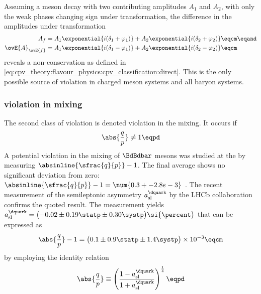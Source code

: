 Assuming a meson decay with two contributing amplitudes $A_1$ and $A_2$, with
only the weak phases changing sign under \CP transformation, the difference in
the amplitudes under \CP transformation
%
\begin{equation}
  \begin{split}
                A_{f} &= A_1 \exponential{i(\delta_1 + \varphi_1)} + A_2 \exponential{i(\delta_2 + \varphi_2)} \eqcm\eqand \\
    \ovE{A}_{\ovE{f}} &= A_1 \exponential{i(\delta_1 - \varphi_1)} + A_2 \exponential{i(\delta_2 - \varphi_2)} \eqcm
  \end{split}
\end{equation}
%
reveals a \CP non-conservation as defined in
\cref{eq:cpv_theory:flavour_physics:cpv_classification:direct}. This is the only
possible source of \CP violation in charged meson systems and all baryon
systems.

\subsubsection[\CP violation in mixing]{\CPbfsf violation in mixing}
\label{sec:cpv_theory:flavour_physics:cpv_classification:mixing}

The second class of \CP violation is denoted \CP violation in the mixing. It
occurs if
%
\begin{equation}
  \abs{\frac{q}{p}} \neq 1 \eqpd
\end{equation}
%
A potential \CP violation in the mixing of $\BdBdbar$ mesons was studied at the
\BFactories by measuring $\absinline{\sfrac{q}{p}} - 1$. The final \BFactory
average shows no significant deviation from zero: $\absinline{\sfrac{q}{p}} - 1
= \num{0.3 +- 2.8 e-3}$ \cite{Bevan:2014iga}. The recent measurement of the
semileptonic \CP asymmetry $a_{\text{sl}}^{\dquark}$ by the \acs*{LHCb}
collaboration confirms the quoted result. The measurement yields
$a_{\text{sl}}^{\dquark} = \bigl(-0.02 \pm 0.19 \statp \pm 0.30 \systp
\bigr)\si{\percent}$ \cite{Aaij:2014nxa} that can be expressed as
%
\begin{equation}
  \abs{\frac{q}{p}} - 1 = \bigl(0.1 \pm 0.9 \statp \pm 1.4 \systp \bigr) \times 10^{-3} \eqcm
\end{equation}
%
by employing the identity relation
%
\begin{equation}
  \abs{\frac{q}{p}} \equiv \left(\frac{1 - a_{\text{sl}}^{\dquark}}{1 + a_{\text{sl}}^{\dquark}}\right)^{\frac{1}{4}} \eqpd
\end{equation}
%

